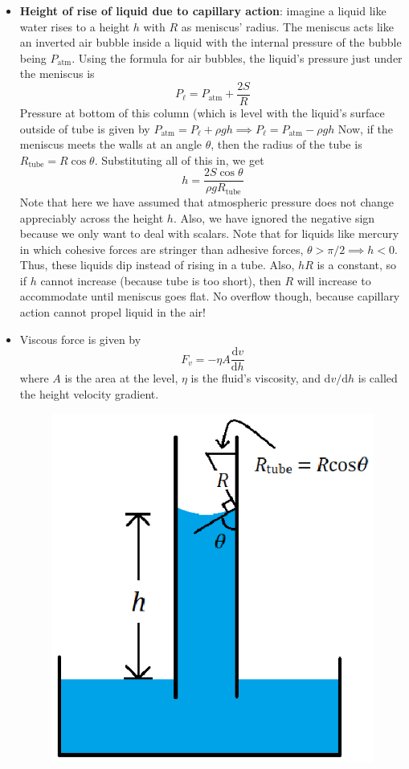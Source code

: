 \documentclass{scrartcl}
\begin{document}
\begin{itemize}
        \item \textbf{Height of rise of liquid due to capillary action}: imagine a liquid like water rises to a height $h$ with $R$ as meniscus' radius. The meniscus acts like an inverted air bubble inside a liquid with the internal pressure of the bubble being $P_\text{atm}$. Using the formula for air bubbles, the liquid's pressure just under the meniscus is \[P_\ell=P_\text{atm}+\frac{2S}R\] Pressure at bottom of this column (which is level with the liquid's surface outside of tube is given by $P_\text{atm}=P_\ell+\rho gh\implies P_\ell=P_\text{atm}-\rho gh$ Now, if the meniscus meets the walls at an angle $\theta$, then the radius of the tube is $R_\text{tube}=R\cos\theta$. Substituting all of this in, we get \[h=\frac{2S\cos\theta}{\rho gR_\text{tube}}\] Note that here we have assumed that atmospheric pressure does not change appreciably across the height $h$. Also, we have ignored the negative sign because we only want to deal with scalars. Note that for liquids like mercury in which cohesive forces are stringer than adhesive forces, $\theta>\pi/2\implies h<0$. Thus, these liquids dip instead of rising in a tube. Also, $hR$ is a constant, so if $h$  cannot increase (because tube is too short), then $R$ will increase to accommodate until meniscus goes flat. No overflow though, because capillary action cannot propel liquid in the air!
        \item Viscous force is given by \[F_v=-\eta A\frac{\mathrm dv}{\mathrm dh}\] where $A$ is the area at the level, $\eta$ is the fluid's viscosity, and $\mathrm dv/\mathrm dh$ is called the height velocity gradient.
        \begin{figure}[H]
            \centering
            \begin{minipage}[b]{0.4\textwidth}
                \includegraphics[width=\textwidth]{capillary.eps}

\end{minipage}
\end{figure}
\end{itemize}
\end{document}
